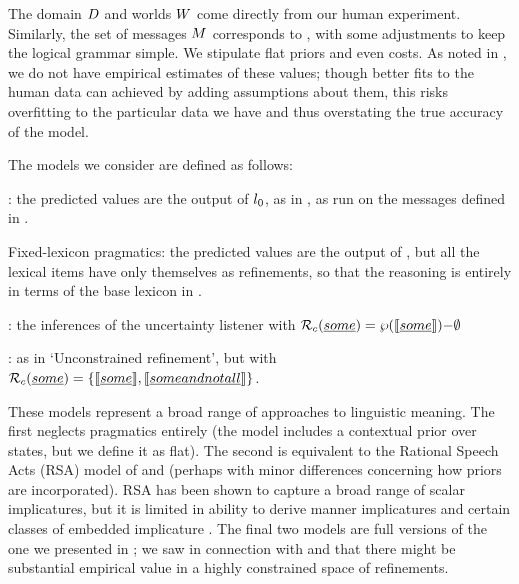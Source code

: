 \documentclass[leqno]{article}
\begin{document}
The domain $D$ and worlds $W$ come directly from our human
experiment. Similarly, the set of messages $M$ corresponds to
, with some adjustments to keep the logical grammar
simple. We stipulate flat priors and even costs. As noted in
, we do not have empirical estimates of these
values; though better fits to the human data can achieved by adding
assumptions about them, this risks overfitting to the particular data
we have and thus overstating the true accuracy of the model.

The models we consider are defined as follows:
%
\begin{examples}
\item 
  \begin{examples}
  \item {}: the predicted values are the output of
    $l_{0}$, as in , as run on the messages
    defined in .
  \item Fixed-lexicon pragmatics: the predicted values are the output
    of , but all the lexical items have only
    themselves as refinements, so that the reasoning is entirely in
    terms of the base lexicon in .
  \item {}: the inferences of the
    uncertainty listener  with $\mathcal{R}_{c}(\emph{some})
    = \wp(\llbracket\emph{some}\rrbracket){-}\emptyset$
  \item {}: as in `Unconstrained
    refinement', but with $\mathcal{R}_{c}(\emph{some}) =
    \left\{ \llbracket\emph{some}\rrbracket, \llbracket\emph{some and not all}\rrbracket \right\}$.
  \end{examples}
\end{examples}

These models represent a broad range of approaches to linguistic
meaning. The first neglects pragmatics entirely (the model includes a
contextual prior over states, but we define it as flat). The second is
equivalent to the Rational Speech Acts (RSA) model of
\citet{Frank:Goodman:2012} and \citet{Goodman:Stuhlmuller:2013}
(perhaps with minor differences concerning how priors are
incorporated). RSA has been shown to capture a broad range of scalar
implicatures, but it is limited in ability to derive manner
implicatures and certain classes of embedded implicature
\citep{Bergen:Goodman:Levy:2012,Bergen:Levy:Goodman:2014}. The final
two models are full versions of the one we presented in
; we saw in connection with  and
 that there might be substantial empirical
value in a highly constrained space of refinements.
\end{document}

